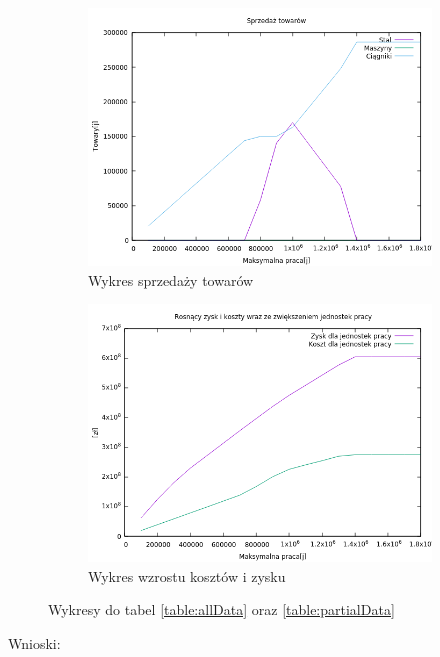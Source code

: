 \documentclass{article}
\begin{document}
\begin{figure}[H]
\begin{subfigure}[b]{0.4\linewidth}
    \includegraphics[width=\linewidth]{output/sprzedaz.png}
    \caption{Wykres sprzedaży towarów}
    \label{fig:sprzedaz}
  \end{subfigure}
  \begin{subfigure}[b]{0.4\linewidth}
    \includegraphics[width=\linewidth]{output/chart.png}
    \caption{Wykres wzrostu kosztów i zysku}
    \label{fig:chart}
  \end{subfigure}
  \caption{Wykresy do tabel \ref{table:allData} oraz \ref{table:partialData}}
\end{figure}


Wnioski:
\end{document}
